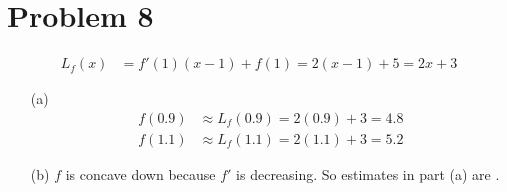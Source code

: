 \documentclass[preview, margin=0.6in]{standalone}
\newcommand*{\problem}[1]{\section*{Problem #1}}
\begin{document}
\problem{8}
\begin{align*}
	L_f(x)&=f'(1)(x-1)+f(1)
	=2(x-1)+5
	=2x+3
\end{align*}
\begin{itemize}
	\item[(a)]
	\begin{align*}
		f(0.9)&\approx L_f(0.9)=2(0.9)+3=\boxed{4.8} \\
		f(1.1)&\approx L_f(1.1)=2(1.1)+3=\boxed{5.2}
	\end{align*}

	\item[(b)] $f$ is concave down because $f'$ is decreasing. So estimates in part (a) are .
\end{itemize}
\end{document}
